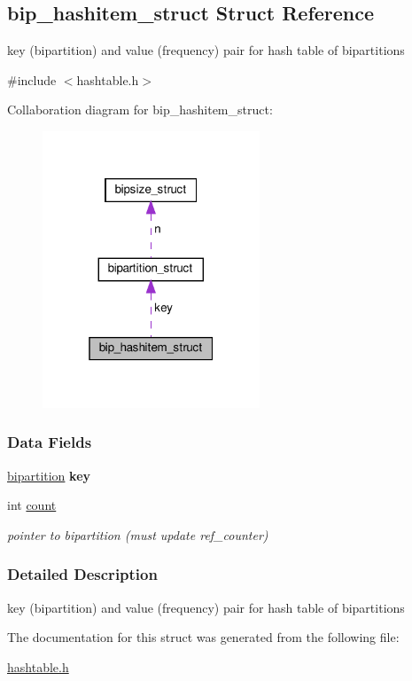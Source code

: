 \hypertarget{structbip__hashitem__struct}{}\subsection{bip\+\_\+hashitem\+\_\+struct Struct Reference}
\label{structbip__hashitem__struct}


key (bipartition) and value (frequency) pair for hash table of bipartitions  




{\ttfamily \#include $<$hashtable.\+h$>$}



Collaboration diagram for bip\+\_\+hashitem\+\_\+struct\+:\nopagebreak
\begin{figure}[H]
\begin{center}
\leavevmode
\includegraphics[width=184pt]{structbip__hashitem__struct__coll__graph}
\end{center}
\end{figure}
\subsubsection*{Data Fields}
\begin{DoxyCompactItemize}
\item 
\mbox{\label{structbip__hashitem__struct_a12ef81b65e6d8b0e3d09cf75dc45b9d5}} 
\hyperlink{structbipartition__struct}{bipartition} {\bfseries key}
\item 
\mbox{\label{structbip__hashitem__struct_a72dfaa13a770d59596036a35c46cddc2}} 
int \hyperlink{structbip__hashitem__struct_a72dfaa13a770d59596036a35c46cddc2}{count}
\begin{DoxyCompactList}\small\item\em pointer to bipartition (must update ref\+\_\+counter) \end{DoxyCompactList}\end{DoxyCompactItemize}


\subsubsection{Detailed Description}
key (bipartition) and value (frequency) pair for hash table of bipartitions 

The documentation for this struct was generated from the following file\+:\begin{DoxyCompactItemize}
\item 
\hyperlink{hashtable_8h}{hashtable.\+h}\end{DoxyCompactItemize}
